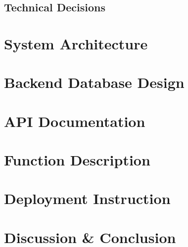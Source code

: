 \documentclass[12pt, a4paper]{report}
\begin{document}
\section{Technical Decisions} \label{ch6}


\chapter{System Architecture} \label{ch7}


\chapter{Backend Database Design} \label{ch8}


\chapter{API Documentation} \label{ch9}


\chapter{Function Description} \label{ch10}


\chapter{Deployment Instruction} \label{ch11}


\chapter{Discussion \& Conclusion} \label{ch12}





\appendix

\end{document}
